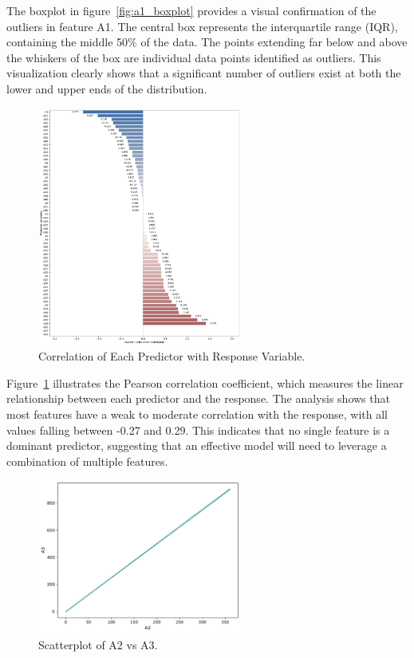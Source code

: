 \documentclass[11pt]{report}
\begin{document}
The boxplot in figure~\ref{fig:a1_boxplot} provides a visual confirmation of the outliers in feature A1. The central box represents the interquartile range (IQR), containing the middle 50\% of the data. The points extending far below and above the whiskers of the box are individual data points identified as outliers. This visualization clearly shows that a significant number of outliers exist at both the lower and upper ends of the distribution.

\begin{figure}[H]
    \centering
    \includegraphics[width=0.6\textwidth]{images/correlation_with_T.pdf}
    \caption{Correlation of Each Predictor with Response Variable.}
    \label{fig:correlation_with_T}
\end{figure}

Figure~\ref{fig:correlation_with_T} illustrates the Pearson correlation coefficient, which measures the linear relationship between each predictor and the response. The analysis shows that most features have a weak to moderate correlation with the response, with all values falling between -0.27 and 0.29. This indicates that no single feature is a dominant predictor, suggesting that an effective model will need to leverage a combination of multiple features.

\begin{figure}[H]
    \centering
    \includegraphics[width=0.6\textwidth]{images/A2_vs_A3_scatterplot.pdf}
    \caption{Scatterplot of A2 vs A3.}
    \label{fig:A2_vs_A3_scatterplot}
\end{figure}
\end{document}
